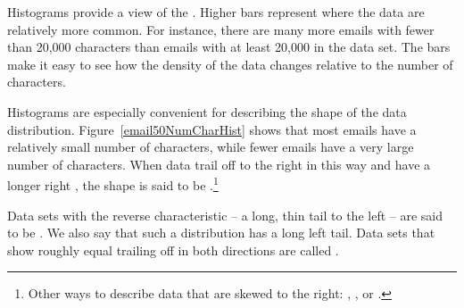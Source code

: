 \begin{doublespace}
Histograms provide a view of the . Higher bars represent where the data are relatively more common. For instance, there are many more emails with fewer than 20,000 characters than emails with at least 20,000 in the data set. The bars make it easy to see how the density of the data changes relative to the number of characters.

Histograms are especially convenient for describing the shape of the data distribution\label{shapeFirstDiscussed}. Figure~\ref{email50NumCharHist} shows that most emails have a relatively small number of characters, while fewer emails have a very large number of characters. When data trail off to the right in this way and have a longer right , the shape is said to be .\footnote{Other ways to describe data that are skewed to the right: , , or .}

Data sets with the reverse characteristic -- a long, thin tail to the left -- are said to be . We also say that such a distribution has a long left tail. Data sets that show roughly equal trailing off in both directions are called .

\end{doublespace}

